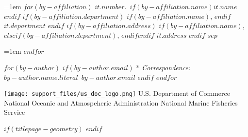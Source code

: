 \begin{minipage}[b][\textheight][s]{\textwidth}
\vspace{2\baselineskip}

\hangindent=1em
$for(by-affiliation)$%
{$it.number$}.~$if(by-affiliation.name)${$it.name$}$endif$%
$if(by-affiliation.department)$%
$if(by-affiliation.name)$, $endif$%
{$it.department$}%
$endif$%
$if(by-affiliation.address)$%
$if(by-affiliation.name)$, $else$$if(by-affiliation.department)$, $endif$$endif$%
{$it.address$}%
$endif$%
$sep$\par\hangindent=1em%
$endfor$

\vspace{1\baselineskip}

$for(by-author)$
$if(by-author.email)$
* \textit{Correspondence:}~$by-author.name.literal$~$by-author.email$
$endif$
$endfor$


\vfill


\vspace{1\baselineskip}

\texttt{[image: support\_files/us\_doc\_logo.png]}\newline
U.S. Department of Commerce\newline
National Oceanic and Atmospeheric Administration\newline
National Marine Fisheries Service\newline

\end{minipage}
$if(titlepage-geometry)$
\restoregeometry
$endif$
